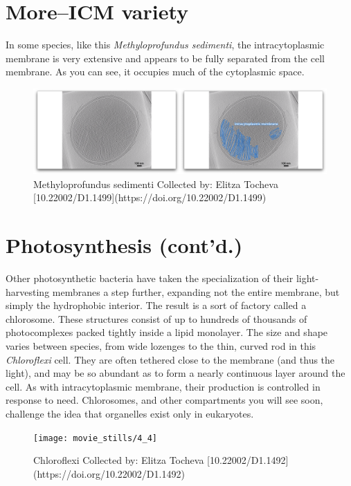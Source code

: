 \documentclass[]{tufte-book}
\begin{document}
\hypertarget{moreicm-variety}{\section{More--ICM
variety}\label{moreicm-variety}}

In some species, like this \emph{Methyloprofundus sedimenti}, the
intracytoplasmic membrane is very extensive and appears to be fully
separated from the cell membrane. As you can see, it occupies much of
the cytoplasmic space.

\begin{figure}
\includegraphics{movie_stills/4_3a} \caption[Methyloprofundus sedimenti Collected by]{Methyloprofundus sedimenti Collected by: Elitza Tocheva [10.22002/D1.1499](https://doi.org/10.22002/D1.1499)}\label{fig:unnamed-chunk-63}
\end{figure}

\section{Photosynthesis (cont'd.)}\label{photosynthesis-contd.}

Other photosynthetic bacteria have taken the specialization of their
light-harvesting membranes a step further, expanding not the entire
membrane, but simply the hydrophobic interior. The result is a sort of
factory called a chlorosome. These structures consist of up to hundreds
of thousands of photocomplexes packed tightly inside a lipid monolayer.
The size and shape varies between species, from wide lozenges to the
thin, curved rod in this \emph{Chloroflexi} cell. They are often
tethered close to the membrane (and thus the light), and may be so
abundant as to form a nearly continuous layer around the cell. As with
intracytoplasmic membrane, their production is controlled in response to
need. Chlorosomes, and other compartments you will see soon, challenge
the idea that organelles exist only in eukaryotes.

\begin{figure}
\texttt{[image: movie\_stills/4\_4]} \caption[Chloroflexi Collected by]{Chloroflexi Collected by: Elitza Tocheva [10.22002/D1.1492](https://doi.org/10.22002/D1.1492)}\label{fig:unnamed-chunk-64}
\end{figure}
\end{document}
